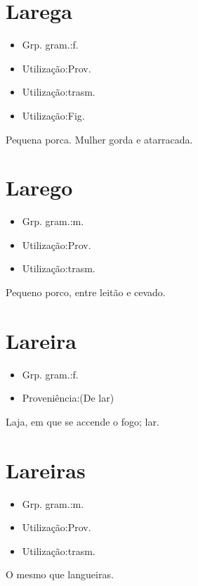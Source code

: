 \section{Larega}
\begin{itemize}
\item {Grp. gram.:f.}
\end{itemize}
\begin{itemize}
\item {Utilização:Prov.}
\end{itemize}
\begin{itemize}
\item {Utilização:trasm.}
\end{itemize}
\begin{itemize}
\item {Utilização:Fig.}
\end{itemize}
Pequena porca.
Mulher gorda e atarracada.
\section{Larego}
\begin{itemize}
\item {Grp. gram.:m.}
\end{itemize}
\begin{itemize}
\item {Utilização:Prov.}
\end{itemize}
\begin{itemize}
\item {Utilização:trasm.}
\end{itemize}
Pequeno porco, entre leitão e cevado.
\section{Lareira}
\begin{itemize}
\item {Grp. gram.:f.}
\end{itemize}
\begin{itemize}
\item {Proveniência:(De \textunderscore lar\textunderscore )}
\end{itemize}
Laja, em que se accende o fogo; lar.
\section{Lareiras}
\begin{itemize}
\item {Grp. gram.:m.}
\end{itemize}
\begin{itemize}
\item {Utilização:Prov.}
\end{itemize}
\begin{itemize}
\item {Utilização:trasm.}
\end{itemize}
O mesmo que \textunderscore langueiras\textunderscore .
